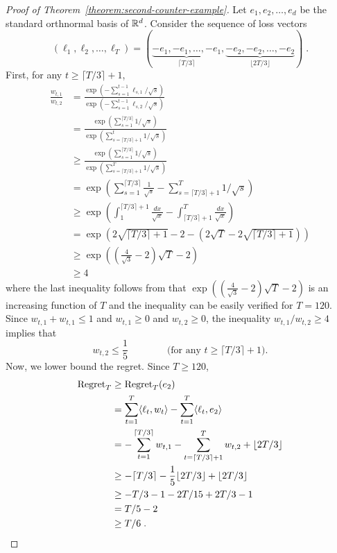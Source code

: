 \begin{proof}[Proof of Theorem~\ref{theorem:second-counter-example}]
Let $e_1, e_2, \dots, e_d$ be the standard orthnormal basis of $\mathbb{R}^d$. Consider the sequence of loss vectors
$$
(\ell_1, \ell_2, \dots, \ell_T) = ( \underbrace{-e_1, -e_1, \dots, -e_1}_{\lceil T/3 \rceil}, \underbrace{-e_2, -e_2, \dots, -e_2}_{\lfloor 2T/3 \rfloor}) \; .
$$
First, for any $t \ge \lceil T/3 \rceil + 1$,
\begin{align*}
\frac{w_{t,1}}{w_{t,2}}
& = \frac{\exp(-\sum_{s=1}^{t-1} \ell_{s,1}/\sqrt{s})}{\exp(-\sum_{s=1}^{t-1} \ell_{s,2}/\sqrt{s})} \\
& = \frac{\exp(\sum_{s=1}^{\lceil T/3 \rceil} 1/\sqrt{s})}{\exp(\sum_{s=\lceil T/3 \rceil + 1}^t 1/\sqrt{s})} \\
& \ge \frac{\exp(\sum_{s=1}^{\lceil T/3 \rceil} 1/\sqrt{s})}{\exp(\sum_{s=\lceil T/3 \rceil + 1}^T 1/\sqrt{s})} \\
& = \exp\left(\sum_{s=1}^{\lceil T/3 \rceil} \frac{1}{\sqrt{s}} - \sum_{s=\lceil T/3 \rceil + 1}^T 1/\sqrt{s} \right) \\
& \ge \exp\left( \int_{1}^{\lceil T/3 \rceil + 1} \frac{dx}{\sqrt{x}} - \int_{\lceil T/3 \rceil + 1}^T \frac{dx}{\sqrt{x}} \right) \\
& = \exp\left( 2\sqrt{\lceil T/3 \rceil + 1} - 2 - (2\sqrt{T} - 2 \sqrt{\lceil T/3 \rceil + 1}) \right) \\
& \ge \exp\left( \left( \frac{4}{\sqrt{3}} - 2 \right) \sqrt{T} - 2 \right) \\
& \ge 4
\end{align*}
where the last inequality follows from that $\exp\left( \left(
\frac{4}{\sqrt{3}} - 2 \right) \sqrt{T} - 2 \right)$ is an increasing function
of $T$ and the inequality can be easily verified for $T=120$. Since $w_{t,1} +
w_{t,1} \le 1$ and $w_{t,1} \ge 0$ and $w_{t,2} \ge 0$, the inequality $w_{t,1}/w_{t,2} \ge 4$ implies that
$$
w_{t,2} \le \frac{1}{5} \qquad \qquad \text{(for any $t \ge \lceil T/3 \rceil + 1$)}.
$$
Now, we lower bound the regret. Since $T \ge 120$,
\begin{align*}
\operatorname{Regret}_T
& \ge \operatorname{Regret}_T(e_2) \\
& = \sum_{t=1}^T \langle \ell_t, w_t \rangle - \sum_{t=1}^T \langle \ell_t, e_2 \rangle \\
& = - \sum_{t=1}^{\lceil T/3 \rceil} w_{t,1} - \sum_{t=\lceil T/3 \rceil + 1}^T w_{t,2}  +  \lfloor 2T/3 \rfloor \\
& \ge - \lceil T/3 \rceil - \frac{1}{5} \lfloor 2T/3 \rfloor  +  \lfloor 2T/3 \rfloor \\
& \ge - T/3 - 1 - 2T/15 + 2T/3 - 1 \\
& = T/5 - 2 \\
& \ge T/6 \; .
\end{align*}
\end{proof}
